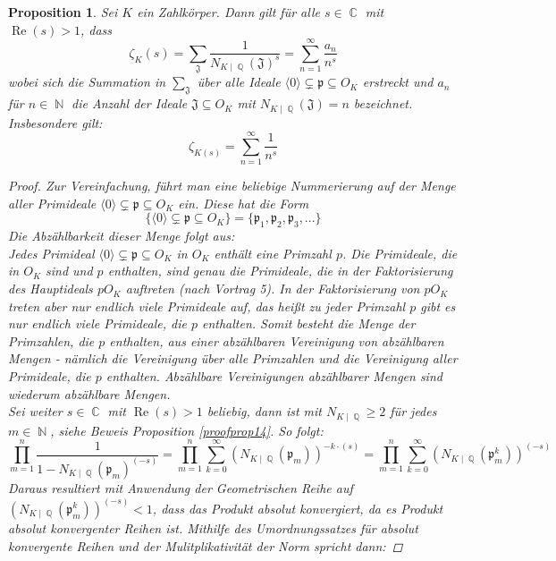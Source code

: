 \documentclass[10pt,a4paper]{article}
\theoremstyle{plain}
\newtheorem{prop}[thm]{Proposition}
\theoremstyle{definition}
\theoremstyle{remark}
\DeclareMathOperator{\C}{\mathbb{C}}
\DeclareMathOperator{\Q}{\mathbb{Q}}
\DeclareMathOperator{\N}{\mathbb{N}}
\DeclareMathOperator{\re}{Re}
\begin{document}
\begin{prop}

Sei $\textit{K}$ ein Zahlkörper. Dann gilt für alle $s \in \C $ mit $ \re(s)>1$, dass$$\zeta_{K}(s) = \sum_{\mathfrak{J}}\frac{1}{N_{K\mid\Q}(\mathfrak{J})^s}=\sum_{n=1}^{\infty}\frac{a_n}{n^s}$$
wobei sich die Summation in $\sum_{\mathfrak{J}}$ über alle Ideale $\langle0\rangle\subsetneq \mathfrak{p} \subseteq O_{\textit{K}}$ erstreckt und $a_n$ für $n \in \N$ die Anzahl der Ideale $\mathfrak{J} \subseteq O_K$ mit $N_{K\mid \Q}(\mathfrak{J}) = n$ bezeichnet. Insbesondere gilt: $$\zeta_{K(s)}= \sum_{n=1}^{\infty}\frac{1}{n^s}$$

\begin{proof}

Zur Vereinfachung, führt man eine beliebige Nummerierung auf der Menge aller Primideale $\langle0\rangle\subsetneq \mathfrak{p} \subseteq O_{\textit{K}}$ ein. Diese hat die Form $$\{\langle0\rangle\subsetneq \mathfrak{p} \subseteq O_{\textit{K}}\}=\{\mathfrak{p}_1,\mathfrak{p}_2,\mathfrak{p}_3,...\}$$Die Abzählbarkeit dieser Menge folgt aus: 
\\
Jedes Primideal $\langle0\rangle\subsetneq \mathfrak{p} \subseteq O_{K}$ in $O_K$ enthält eine Primzahl $p$. Die Primideale, die in $O_K$ sind und $p$ enthalten, sind genau die Primideale, die in der Faktorisierung des Hauptideals $pO_K$ auftreten (nach Vortrag 5). In der Faktorisierung von $pO_K$ treten aber nur endlich viele Primideale auf, das heißt zu jeder Primzahl $p$ gibt es nur endlich viele Primideale, die $p$ enthalten. Somit besteht die Menge der Primzahlen, die $p$ enthalten, aus einer abzählbaren Vereinigung von abzählbaren Mengen - nämlich die Vereinigung über alle Primzahlen und die Vereinigung aller Primideale, die $p$ enthalten. Abzählbare Vereinigungen abzählbarer Mengen sind wiederum abzählbare Mengen.
\\
Sei weiter $s \in \C $ mit $ \re(s) > 1$ beliebig, dann ist mit $N_{K\mid \Q}\geq 2$ für jedes $m \in \N$,  siehe Beweis Proposition \ref{proofprop14}. So folgt:$$\prod_{m=1}^{n}\frac{1}{1-N_{K\mid \Q}(\mathfrak{p}_m)^{(-s)}} =\prod_{m=1}^{n}\sum_{k=0}^{\infty}(N_{K\mid \Q}(\mathfrak{p}_m))^{-k\cdot(s)}=\prod_{m=1}^{n}\sum_{k=0}^{\infty}(N_{K\mid \Q}(\mathfrak{p}_m^k))^{(-s)}$$
Daraus resultiert mit Anwendung der Geometrischen Reihe auf \\
$(N_{K\mid \Q}(\mathfrak{p}_m^k))^{(-s)} < 1$, dass das Produkt absolut konvergiert, da es Produkt absolut konvergenter Reihen ist. Mithilfe des Umordnungssatzes für absolut konvergente Reihen und der Mulitplikativität der Norm spricht dann:

\end{proof}
\end{prop}
\end{document}

